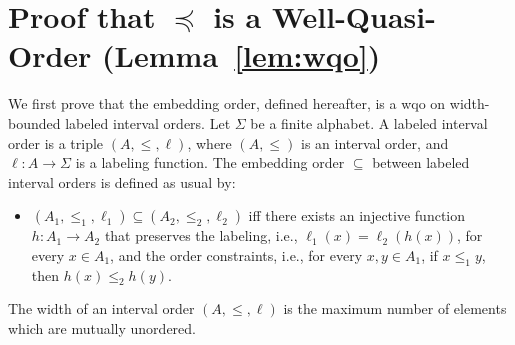 \section{Proof that $\preceq$ is a Well-Quasi-Order (Lemma~\ref{lem:wqo})}
\label{sec:proof}

We first prove that the embedding order, defined hereafter, is a wqo on width-bounded
labeled interval orders.
Let $\Sigma$ be a finite alphabet. A labeled interval order is a triple $(A,\leq,\ell)$, where $(A,\leq)$ is an interval
order, and $\ell:A\rightarrow \Sigma$ is a labeling function. The embedding order $\subseteq$ between labeled interval orders is defined as
usual by:
\begin{itemize}
	\item $(A_1,\leq_1,\ell_1)\subseteq (A_2,\leq_2,\ell_2)$ iff there exists an injective function $h:A_1\rightarrow A_2$ that
	preserves the labeling, i.e., $\ell_1(x)=\ell_2(h(x))$, for every $x\in A_1$, and the order constraints, i.e.,
	for every $x,y\in A_1$, if $x \leq_1 y$, then $h(x)\leq_2 h(y)$.
\end{itemize}

The width of an interval order $(A,\leq,\ell)$ is the maximum number of elements which are mutually unordered.

